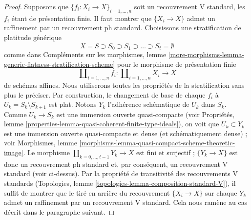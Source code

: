 \begin{proof}
\medskip\noindent
Supposons que $\{f_i : X_i \to X\}_{i = 1, \ldots, n}$
soit un recouvrement V standard, les $f_i$ étant de présentation finie.
Il faut montrer que $\{X_i \to X\}$ admet un raffinement par un recouvrement ph standard.
Choisissons une stratification de platitude générique
$$
X = S \supset S_0 \supset S_1 \supset \ldots \supset S_t = \emptyset
$$
comme dans Compléments sur les morphismes, lemme
\ref{more-morphisms-lemma-generic-flatness-stratification-scheme}
pour le morphisme de présentation finie
$$
\coprod\nolimits_{i = 1, \ldots, n} f_i :
\coprod\nolimits_{i = 1, \ldots, n} X_i
\longrightarrow
X
$$
de schémas affines. Nous utiliserons toutes les propriétés de la stratification
sans plus le préciser. Par construction, le changement de base de chaque $f_i$ à
$U_k = S_k \setminus S_{k + 1}$ est plat.
Notons $Y_k$ l'adhérence schématique de $U_k$ dans $S_k$. Comme
$U_k \to S_k$ est une immersion ouverte quasi-compacte (voir
Propriétés, lemme \ref{properties-lemma-quasi-coherent-finite-type-ideals}),
on voit que $U_k \subset Y_k$ est une immersion ouverte quasi-compacte et dense
(et schématiquement dense) ; voir
Morphismes, lemme \ref{morphisms-lemma-quasi-compact-scheme-theoretic-image}.
Le morphisme $\coprod_{k = 0, \ldots, t - 1} Y_k \to X$
est fini et surjectif ; $\{Y_k \to X\}$ est donc un recouvrement ph standard
et, par conséquent, un recouvrement V standard (voir ci-dessus). Par la propriété de transitivité
des recouvrements V standards
(Topologies, lemme \ref{topologies-lemma-composition-standard-V}),
il suffit de montrer que le tiré en arrière
du recouvrement $\{X_i \to X\}$ sur chaque $Y_k$ admet un raffinement par un
recouvrement V standard. Cela nous ramène au cas décrit dans le
paragraphe suivant.


\end{proof}
